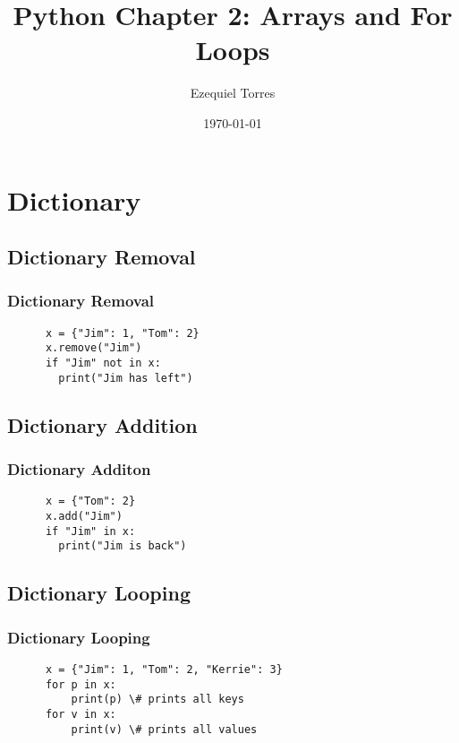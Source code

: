 \documentclass{beamer}
\begin{document}
\title{Python Chapter 2: Arrays and For Loops}
\author{Ezequiel Torres}
\date{\today}
\frame{\titlepage}




\section{Dictionary}


\subsection{Dictionary Removal}
\begin{frame}[fragile]
\frametitle{Dictionary Removal}
  \begin{lstlisting}
      x = {"Jim": 1, "Tom": 2}
      x.remove("Jim")
      if "Jim" not in x:
        print("Jim has left")
  \end{lstlisting}
\end{frame}

\subsection{Dictionary Addition}
\begin{frame}[fragile]
\frametitle{Dictionary Additon}
  \begin{lstlisting}
      x = {"Tom": 2}
      x.add("Jim")
      if "Jim" in x:
        print("Jim is back")
  \end{lstlisting}
\end{frame}

\subsection{Dictionary Looping}
\begin{frame}[fragile]
\frametitle{Dictionary Looping}
  \begin{lstlisting}
      x = {"Jim": 1, "Tom": 2, "Kerrie": 3}
      for p in x:
          print(p) \# prints all keys
      for v in x:
          print(v) \# prints all values
  \end{lstlisting}
\end{frame}
\end{document}
